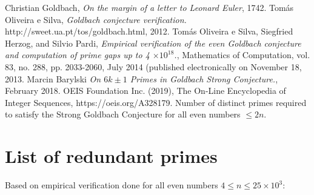 \documentclass[10pt,twocolumn]{article}
\begin{document}
\begin{thebibliography}{9}
  Christian Goldbach, 
  \emph{On the margin of a letter to Leonard Euler},
  1742.
  Tomás Oliveira e Silva,
  \emph{Goldbach conjecture verification.}
  http://sweet.ua.pt/tos/goldbach.html,
  2012.
  Tomás Oliveira e Silva, Siegfried Herzog, and Silvio Pardi, 
  \emph{Empirical verification of the even Goldbach conjecture and computation of prime gaps up to 4 $\times 10^{18}$.}, 
  Mathematics of Computation, vol. 83, no. 288, pp. 2033-2060, 
  July 2014 (published electronically on November 18, 2013.
  Marcin Barylski
  \emph{On $6k \pm 1$ Primes in Goldbach Strong Conjecture.}, 
  February 2018.
  OEIS Foundation Inc. (2019), The On-Line Encyclopedia of Integer Sequences, https://oeis.org/A328179. Number of distinct primes required to satisfy the Strong Goldbach Conjecture for all even numbers $\leq 2n$.

\appendix
\section{List of redundant primes}

Based on empirical verification done for all even numbers $4 \leq n \leq 25 \times 10^3$:


\end{thebibliography}
\end{document}
